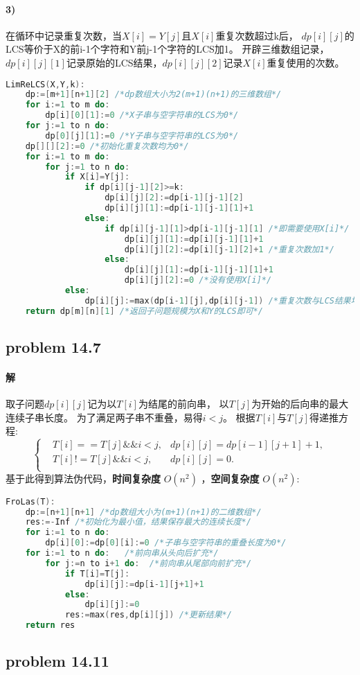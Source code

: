 \documentclass[11pt,a4paper,oneside,oldfontcommands]{ctexart}
\begin{document}
\paragraph*{3)}
在循环中记录重复次数，当$X[i]=Y[j]$且$X[i]$重复次数超过k后，
$dp[i][j]$的LCS等价于X的前i-1个字符和Y前j-1个字符的LCS加1。
开辟三维数组记录，$dp[i][j][1]$记录原始的LCS结果，$dp[i][j][2]$记录$X[i]$重复使用的次数。
\begin{lstlisting}[language=C++,title=LimReLCS.func]
LimReLCS(X,Y,k):
	dp:=[m+1][n+1][2] /*dp数组大小为2(m+1)(n+1)的三维数组*/
	for i:=1 to m do:
		dp[i][0][1]:=0 /*X子串与空字符串的LCS为0*/
	for j:=1 to n do:
		dp[0][j][1]:=0 /*Y子串与空字符串的LCS为0*/
	dp[][][2]:=0 /*初始化重复次数均为0*/
	for i:=1 to m do:
		for j:=1 to n do:
			if X[i]=Y[j]:
				if dp[i][j-1][2]>=k:
					dp[i][j][2]:=dp[i-1][j-1][2]
					dp[i][j][1]:=dp[i-1][j-1][1]+1
				else:
					if dp[i][j-1][1]>dp[i-1][j-1][1] /*即需要使用X[i]*/
						dp[i][j][1]:=dp[i][j-1][1]+1
						dp[i][j][2]:=dp[i][j-1][2]+1 /*重复次数加1*/
					else:
						dp[i][j][1]:=dp[i-1][j-1][1]+1
						dp[i][j][2]:=0 /*没有使用X[i]*/
			else:
				dp[i][j]:=max(dp[i-1][j],dp[i][j-1]) /*重复次数与LCS结果均被复制*/
	return dp[m][n][1] /*返回子问题规模为X和Y的LCS即可*/
\end{lstlisting}
\newpage
\hypertarget{14.7}{\subsection*{problem 14.7}}
\paragraph*{解}取子问题$dp[i][j]$记为以$T[i]$为结尾的前向串，
以$T[j]$为开始的后向串的最大连续子串长度。
为了满足两子串不重叠，易得$i<j$。
根据$T[i]$与$T[j]$得递推方程:
$$\left\{
	\begin{aligned}
		&T[i]==T[j]\&\&i<j,&dp[i][j]=dp[i-1][j+1]+1,\\
		&T[i]!=T[j]\&\&i<j,&dp[i][j]=0.\\
	\end{aligned}
\right.
$$
基于此得到算法伪代码，\textbf{时间复杂度} $O(n^2)$
，\textbf{空间复杂度} $O(n^2)$:
\begin{lstlisting}[language=C++,title=FroLas.func]
FroLas(T):
	dp:=[n+1][n+1] /*dp数组大小为(m+1)(n+1)的二维数组*/
	res:=-Inf /*初始化为最小值，结果保存最大的连续长度*/
 	for i:=1 to n do:
		dp[i][0]:=dp[0][i]:=0 /*子串与空字符串的重叠长度为0*/
	for i:=1 to n do:   /*前向串从头向后扩充*/
		for j:=n to i+1 do:  /*前向串从尾部向前扩充*/
			if T[i]=T[j]:
				dp[i][j]:=dp[i-1][j+1]+1
			else:
				dp[i][j]:=0
			res:=max(res,dp[i][j]) /*更新结果*/
	return res
\end{lstlisting}
{\subsection*{problem 14.11}}
\end{document}
